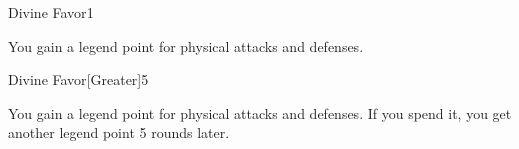 \begin{spellsection}{Divine Favor}{1}
\begin{spellheader}
    \spelldur \durshort
\end{spellheader}
\begin{spellcontent}
    \begin{spelltargetinginfo}
    \end{spelltargetinginfo}
    \begin{spelleffects}
        \spelleffect You gain a legend point for physical attacks and defenses.
        \spelldur \durshort \dismissable
    \end{spelleffects}
\end{spellcontent}
\begin{spellfooter}
\end{spellfooter}
\end{spellsection}

\begin{spellsection}{Divine Favor}[Greater]{5}
\begin{spellheader}
\end{spellheader}
\begin{spellcontent}
    \begin{spelltargetinginfo}
    \end{spelltargetinginfo}
    \begin{spelleffects}
        \spelleffect You gain a legend point for physical attacks and defenses. If you spend it, you get another legend point 5 rounds later.
        \spelldur \durlong \dismissable
    \end{spelleffects}
\end{spellcontent}
\begin{spellfooter}
\end{spellfooter}
\end{spellsection}


